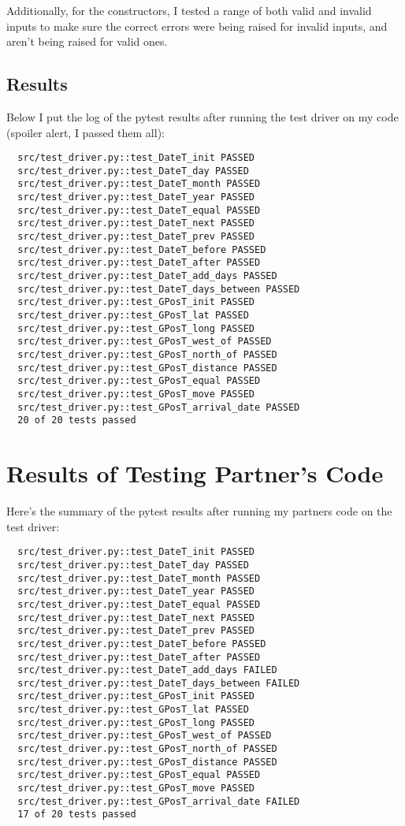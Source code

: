 \documentclass[12pt]{article}
\begin{document}
Additionally, for the constructors, I tested a range of both valid and invalid inputs to make sure the correct errors were being raised for invalid inputs, and aren't being raised for valid ones.

\subsection{Results}
Below I put the log of the pytest results after running the test driver on my code (spoiler alert, I passed them all):

\begin{lstlisting}
  src/test_driver.py::test_DateT_init PASSED
  src/test_driver.py::test_DateT_day PASSED
  src/test_driver.py::test_DateT_month PASSED
  src/test_driver.py::test_DateT_year PASSED
  src/test_driver.py::test_DateT_equal PASSED
  src/test_driver.py::test_DateT_next PASSED
  src/test_driver.py::test_DateT_prev PASSED
  src/test_driver.py::test_DateT_before PASSED
  src/test_driver.py::test_DateT_after PASSED
  src/test_driver.py::test_DateT_add_days PASSED
  src/test_driver.py::test_DateT_days_between PASSED
  src/test_driver.py::test_GPosT_init PASSED
  src/test_driver.py::test_GPosT_lat PASSED
  src/test_driver.py::test_GPosT_long PASSED
  src/test_driver.py::test_GPosT_west_of PASSED
  src/test_driver.py::test_GPosT_north_of PASSED
  src/test_driver.py::test_GPosT_distance PASSED
  src/test_driver.py::test_GPosT_equal PASSED
  src/test_driver.py::test_GPosT_move PASSED
  src/test_driver.py::test_GPosT_arrival_date PASSED
  20 of 20 tests passed
\end{lstlisting}

\section{Results of Testing Partner's Code}

Here's the summary of the pytest results after running my partners code on the test driver:

\begin{lstlisting}
  src/test_driver.py::test_DateT_init PASSED
  src/test_driver.py::test_DateT_day PASSED
  src/test_driver.py::test_DateT_month PASSED
  src/test_driver.py::test_DateT_year PASSED
  src/test_driver.py::test_DateT_equal PASSED
  src/test_driver.py::test_DateT_next PASSED
  src/test_driver.py::test_DateT_prev PASSED
  src/test_driver.py::test_DateT_before PASSED
  src/test_driver.py::test_DateT_after PASSED
  src/test_driver.py::test_DateT_add_days FAILED
  src/test_driver.py::test_DateT_days_between FAILED
  src/test_driver.py::test_GPosT_init PASSED
  src/test_driver.py::test_GPosT_lat PASSED
  src/test_driver.py::test_GPosT_long PASSED
  src/test_driver.py::test_GPosT_west_of PASSED
  src/test_driver.py::test_GPosT_north_of PASSED
  src/test_driver.py::test_GPosT_distance PASSED
  src/test_driver.py::test_GPosT_equal PASSED
  src/test_driver.py::test_GPosT_move PASSED
  src/test_driver.py::test_GPosT_arrival_date FAILED
  17 of 20 tests passed 
\end{lstlisting}
\end{document}
